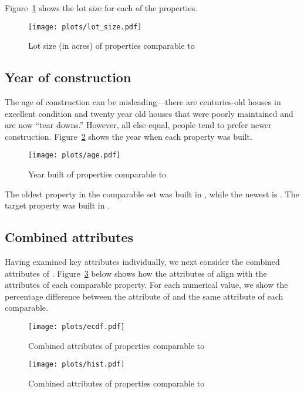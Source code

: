 \documentclass[
12pt, %
letterpaper, %
oneside, %
headinclude,footinclude, %
BCOR5mm, %
]{scrartcl}
\begin{document}
Figure~\ref{fig:lot_size} shows the lot size for each of the properties. 

\begin{figure}
\centering
\caption{Lot size (in acres) of properties comparable to \PropertyName{}} \label{fig:lot_size}  
\texttt{[image: plots/lot\_size.pdf]} 
\end{figure}

\subsection{Year of construction}

The age of construction can be misleading---there are centuries-old houses in excellent condition and twenty year old houses that were poorly maintained and are now ``tear downs.''
However, all else equal, people tend to prefer newer construction.
Figure~\ref{fig:age} shows the year when each property was built.

\begin{figure}
\centering
\caption{Year built of properties comparable to \PropertyName{}} \label{fig:age}  
\texttt{[image: plots/age.pdf]} 
\end{figure}

The oldest property in the comparable set was built in \Oldest{}, while the newest is \Youngest{}.
The target property was built in \PropertyYearBuilt{}. 
\ExtremeWarningAgeYoung{}
\ExtremeWarningAgeOld{}

\subsection{Combined attributes}
Having examined key attributes individually, we next consider the combined attributes of \PropertyName{}.
Figure~\ref{fig:ecdf} below shows how the attributes of \PropertyName{} align with the attributes of each comparable property.
For each numerical value, we show the percentage difference between the attribute of \PropertyName{} and the same attribute of each comparable.

\begin{figure}
\centering
\caption{Combined attributes of properties comparable to \PropertyName{}} \label{fig:ecdf}  
\texttt{[image: plots/ecdf.pdf]} 
\end{figure}

\begin{figure}
\centering
\caption{Combined attributes of properties comparable to \PropertyName{}} \label{fig:hist}  
\texttt{[image: plots/hist.pdf]} 
\end{figure}
\end{document}
